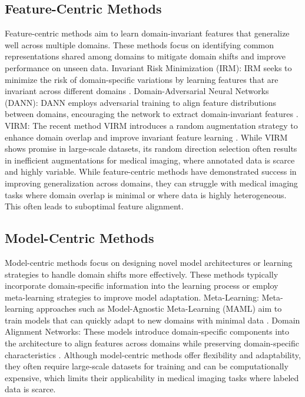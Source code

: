 \subsection{Feature-Centric Methods}

Feature-centric methods aim to learn domain-invariant features that generalize well across multiple domains. These methods focus on identifying common representations shared among domains to mitigate domain shifts and improve performance on unseen data.
Invariant Risk Minimization (IRM): IRM seeks to minimize the risk of domain-specific variations by learning features that are invariant across different domains \cite{arjovsky2019invariant}.
Domain-Adversarial Neural Networks (DANN): DANN employs adversarial training to align feature distributions between domains, encouraging the network to extract domain-invariant features \cite{ganin2016domain}.
VIRM: The recent method VIRM introduces a random augmentation strategy to enhance domain overlap and improve invariant feature learning \cite{zhu2024enlarging}.
While VIRM shows promise in large-scale datasets, its random direction selection often results in inefficient augmentations for medical imaging, where annotated data is scarce and highly variable. 
While feature-centric methods have demonstrated success in improving generalization across domains, they can struggle with medical imaging tasks where domain overlap is minimal or where data is highly heterogeneous. 
This often leads to suboptimal feature alignment.


\subsection{Model-Centric Methods}

Model-centric methods focus on designing novel model architectures or learning strategies to handle domain shifts more effectively. 
These methods typically incorporate domain-specific information into the learning process or employ meta-learning strategies to improve model adaptation.
Meta-Learning: Meta-learning approaches such as Model-Agnostic Meta-Learning (MAML) aim to train models that can quickly adapt to new domains with minimal data \cite{finn2017model}.
Domain Alignment Networks: These models introduce domain-specific components into the architecture to align features across domains while preserving domain-specific characteristics \cite{li2018domain}.
Although model-centric methods offer flexibility and adaptability, they often require large-scale datasets for training and can be computationally expensive, which limits their applicability in medical imaging tasks where labeled data is scarce.

